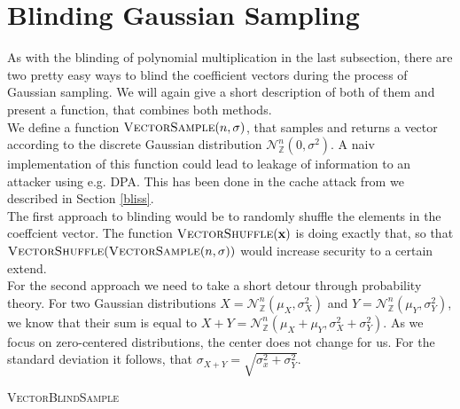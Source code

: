 \section{Blinding Gaussian Sampling}
As with the blinding of polynomial multiplication in the last subsection, there are two pretty easy ways to blind the coefficient vectors during the process of Gaussian sampling. We will again give a short description of both of them and present a function, that combines both methods.\\
We define a function \(\textsc{VectorSample}(n,\sigma)\), that samples and returns a vector according to the discrete Gaussian distribution \(\mathcal{N}_\mathbb{Z}^{n} (0, \sigma^2)\). A naiv implementation of this function could lead to leakage of information to an attacker using e.g. DPA. This has been done in the cache attack from \cite{cryptoeprint:2016:300} we described in Section \ref{bliss}.\\
The first approach to blinding would be to randomly shuffle the elements in the coeffcient vector. The function \(\textsc{VectorShuffle}(\textbf{x})\) is doing exactly that, so that \(\textsc{VectorShuffle}(\textsc{VectorSample}(n,\sigma))\) would increase security to a certain extend.\\
For the second approach we need to take a short detour through probability theory. For two Gaussian distributions \(X=\mathcal{N}_\mathbb{Z}^{n} (\mu_X, \sigma^2_X)\) and \(Y=\mathcal{N}_\mathbb{Z}^{n} (\mu_Y, \sigma^2_Y)\), we know that their sum is equal to \(X+Y=\mathcal{N}_\mathbb{Z}^{n} (\mu_X+\mu_Y, \sigma^2_X+\sigma^2_Y)\). As we focus on zero-centered distributions, the center does not change for us. For the standard deviation it follows, that \(\sigma_{X+Y}=\sqrt{\sigma^2_x+\sigma^2_Y}\).

\begin{algorithm}
    \caption{\textsc{VectorBlindSample}}
    \label{alg:VectorBlindSample}
    \begin{algorithmic}[1]
        \EndFor\\
    \end{algorithmic}
\end{algorithm}